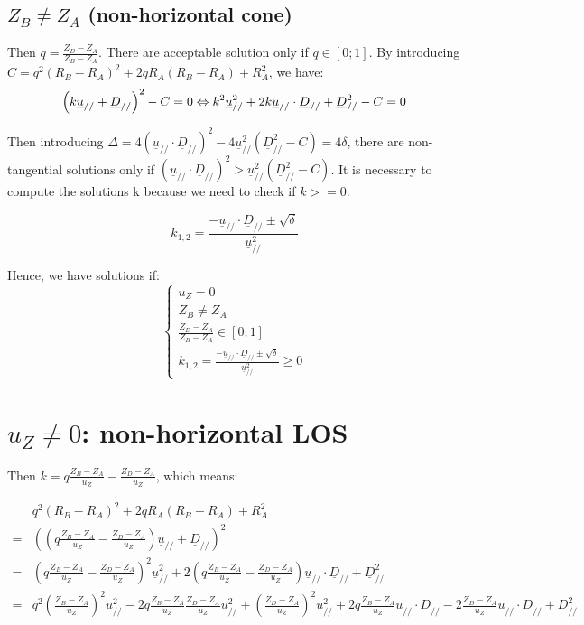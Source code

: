 \documentclass[a4paper,11pt,twoside,titlepage,openright]{book}
\numberwithin{equation}{section}
\newcommand{\ud}[1]{\underline{#1}}
\begin{document}
\subsection{$Z_B\neq Z_A$ (non-horizontal cone)}

Then $q=\frac{Z_D-Z_A}{Z_B-Z_A}$.
There are acceptable solution only if $q\in[0;1]$.
By introducing $C = q^2(R_B-R_A)^2 + 2qR_A(R_B-R_A) + R_A^2$, we have:
$$
\left(k\ud{u}_{//} + \ud{D}_{//}\right)^2 - C = 0\\
\Leftrightarrow k^2\ud{u}_{//}^2 + 2k\ud{u}_{//}\cdot\ud{D}_{//} + \ud{D}_{//}^2-C = 0
$$

Then introducing $\Delta = 4\left(\ud{u}_{//}\cdot\ud{D}_{//}\right)^2 - 4\ud{u}_{//}^2\left(\ud{D}_{//}^2-C\right) = 4\delta$, there are non-tangential solutions only if $\left(\ud{u}_{//}\cdot\ud{D}_{//}\right)^2 > \ud{u}_{//}^2\left(\ud{D}_{//}^2-C\right)$.
It is necessary to compute the solutions k because we need to check if $k>=0$.

$$
k_{1,2} = \frac{-\ud{u}_{//}\cdot\ud{D}_{//} \pm \sqrt{\delta}}{\ud{u}_{//}^2}
$$

Hence, we have solutions if:
$$
\left\{
\begin{array}{lll}
u_Z = 0\\
Z_B\neq Z_A\\
\frac{Z_D-Z_A}{Z_B-Z_A} \in [0;1]\\
k_{1,2} = \frac{-\ud{u}_{//}\cdot\ud{D}_{//} \pm \sqrt{\delta}}{\ud{u}_{//}^2} \geq 0
\end{array}
\right.
$$

\section{$u_Z\neq0$: non-horizontal LOS}

Then $k=q\frac{Z_B-Z_A}{u_Z} - \frac{Z_D-Z_A}{u_Z}$, which means:


$$
\begin{array}{lll}
& q^2(R_B-R_A)^2 + 2qR_A(R_B-R_A) + R_A^2\\
= &\left(\left(q\frac{Z_B-Z_A}{u_Z} - \frac{Z_D-Z_A}{u_Z}\right)\ud{u}_{//} + \ud{D}_{//}\right)^2\\
= &\left(q\frac{Z_B-Z_A}{u_Z} - \frac{Z_D-Z_A}{u_Z}\right)^2\ud{u}_{//}^2 + 2\left(q\frac{Z_B-Z_A}{u_Z} - \frac{Z_D-Z_A}{u_Z}\right)\ud{u}_{//}\cdot\ud{D}_{//} + \ud{D}_{//}^2\\
= &q^2\left(\frac{Z_B-Z_A}{u_Z}\right)^2\ud{u}_{//}^2 - 2q\frac{Z_B-Z_A}{u_Z}\frac{Z_D-Z_A}{u_Z}\ud{u}_{//}^2 + \left(\frac{Z_D-Z_A}{u_Z}\right)^2\ud{u}_{//}^2
+ 2q\frac{Z_B-Z_A}{u_Z}\ud{u}_{//}\cdot\ud{D}_{//} - 2\frac{Z_D-Z_A}{u_Z}\ud{u}_{//}\cdot\ud{D}_{//} + \ud{D}_{//}^2\\ 
\end{array}
$$
\end{document}
